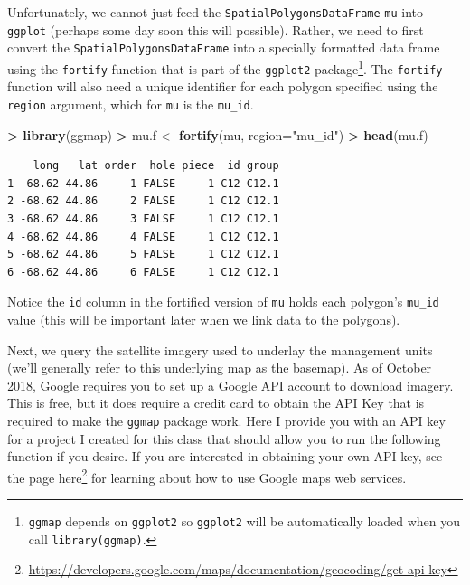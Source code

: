 \documentclass[
]{krantz}
\makeatletter
\newenvironment{Shaded}{\begin{snugshade}}{\end{snugshade}}
\newcommand{\DataTypeTok}[1]{\textcolor[rgb]{0.27,0.27,0.27}{#1}}
\newcommand{\KeywordTok}[1]{\textcolor[rgb]{0.27,0.27,0.27}{\textbf{#1}}}
\newcommand{\NormalTok}[1]{#1}
\newcommand{\OperatorTok}[1]{\textcolor[rgb]{0.43,0.43,0.43}{\textbf{#1}}}
\newcommand{\StringTok}[1]{\textcolor[rgb]{0.5,0.5,0.5}{#1}}
\renewcommand{\href}[2]{#2\footnote{\url{#1}}}
\newenvironment{kframe}{%
\medskip{}
\setlength{\fboxsep}{.8em}
 \def\at@end@of@kframe{}%
 \ifinner\ifhmode%
  \def\at@end@of@kframe{\end{minipage}}%
  \begin{minipage}{\columnwidth}%
 \fi\fi%
 \def\FrameCommand##1{\hskip\@totalleftmargin \hskip-\fboxsep
 \colorbox{shadecolor}{##1}\hskip-\fboxsep
     \hskip-\linewidth \hskip-\@totalleftmargin \hskip\columnwidth}%
 \MakeFramed {\advance\hsize-\width
   \@totalleftmargin\z@ \linewidth\hsize
   \@setminipage}}%
 {\par\unskip\endMakeFramed%
 \at@end@of@kframe}
\renewenvironment{Shaded}{\begin{kframe}}{\end{kframe}}
\makeatother
\begin{document}
Unfortunately, we cannot just feed the \texttt{SpatialPolygonsDataFrame} \texttt{mu} into \texttt{ggplot} (perhaps some day soon this will possible). Rather, we need to first convert the \texttt{SpatialPolygonsDataFrame} into a specially formatted data frame using the \texttt{fortify} function that is part of the \texttt{ggplot2} package\footnote{\texttt{ggmap} depends on \texttt{ggplot2} so \texttt{ggplot2} will be automatically loaded when you call \texttt{library(ggmap)}.}. The \texttt{fortify} function will also need a unique identifier for each polygon specified using the \texttt{region} argument, which for \texttt{mu} is the \texttt{mu\_id}.

\begin{Shaded}
\begin{Highlighting}[]
\OperatorTok{\textgreater{}}\StringTok{ }\KeywordTok{library}\NormalTok{(ggmap)}
\OperatorTok{\textgreater{}}\StringTok{ }\NormalTok{mu.f \textless{}{-}}\StringTok{ }\KeywordTok{fortify}\NormalTok{(mu, }\DataTypeTok{region=}\StringTok{"mu\_id"}\NormalTok{)}
\OperatorTok{\textgreater{}}\StringTok{ }\KeywordTok{head}\NormalTok{(mu.f)}
\end{Highlighting}
\end{Shaded}

\begin{verbatim}
    long   lat order  hole piece  id group
1 -68.62 44.86     1 FALSE     1 C12 C12.1
2 -68.62 44.86     2 FALSE     1 C12 C12.1
3 -68.62 44.86     3 FALSE     1 C12 C12.1
4 -68.62 44.86     4 FALSE     1 C12 C12.1
5 -68.62 44.86     5 FALSE     1 C12 C12.1
6 -68.62 44.86     6 FALSE     1 C12 C12.1
\end{verbatim}

Notice the \texttt{id} column in the fortified version of \texttt{mu} holds each polygon's \texttt{mu\_id} value (this will be important later when we link data to the polygons).

Next, we query the satellite imagery used to underlay the management units (we'll generally refer to this underlying map as the basemap). As of October 2018, Google requires you to set up a Google API account to download imagery. This is free, but it does require a credit card to obtain the API Key that is required to make the \texttt{ggmap} package work. Here I provide you with an API key for a project I created for this class that should allow you to run the following function if you desire. If you are interested in obtaining your own API key, see the page \href{https://developers.google.com/maps/documentation/geocoding/get-api-key}{here} for learning about how to use Google maps web services.
\end{document}
